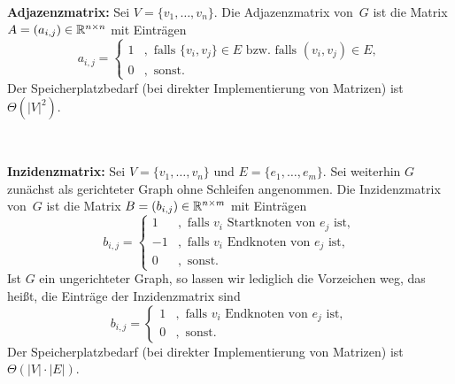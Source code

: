 \begin{defn} 
{\bfseries Adjazenzmatrix:} Sei $V=\{v_1,\ldots,v_n\}$.
Die Adjazenzmatrix von~$G$ ist die Matrix $A=(a_{i,j}) \in \mathbb{R}^{n \times n}$ mit Einträgen
\[
a_{i,j} = \begin{cases}1&,\text{ falls }\{v_i,v_j\} \in E \text{ bzw.~falls }(v_i,v_j) \in E,\\ 0&,\text{ sonst}.\end{cases}
\]
Der Speicherplatzbedarf (bei direkter Implementierung von Matrizen) ist $\Theta(|V|^2)$.

\begin{center}
\hfill
{}
\hfill
{}
\hfill\,
\end{center}
\end{defn} 

\begin{defn}
{\bfseries Inzidenzmatrix:} Sei $V=\{v_1,\ldots,v_n\}$ und $E=\{e_1,\ldots,e_m\}$.
Sei weiterhin $G$ zunächst als gerichteter Graph ohne Schleifen angenommen.
Die Inzidenzmatrix von~$G$ ist die Matrix $B=(b_{i,j}) \in \mathbb{R}^{n \times m}$ mit Einträgen
\[
b_{i,j} = \begin{cases}1&,\text{ falls }v_i\text{ Startknoten von }e_j\text{ ist},\\ -1&,\text{ falls }v_i\text{ Endknoten von }e_j\text{ ist},\\ 0&,\text{ sonst}.\end{cases}
\]
Ist $G$ ein ungerichteter Graph, so lassen wir lediglich die Vorzeichen weg, das heißt, die Einträge der Inzidenzmatrix sind
\[
b_{i,j} = \begin{cases}1&,\text{ falls }v_i\text{ Endknoten von }e_j\text{ ist},\\ 0&,\text{ sonst}.\end{cases}
\]
Der Speicherplatzbedarf (bei direkter Implementierung von Matrizen) ist $\Theta(|V|\cdot|E|)$.
\end{defn} 

